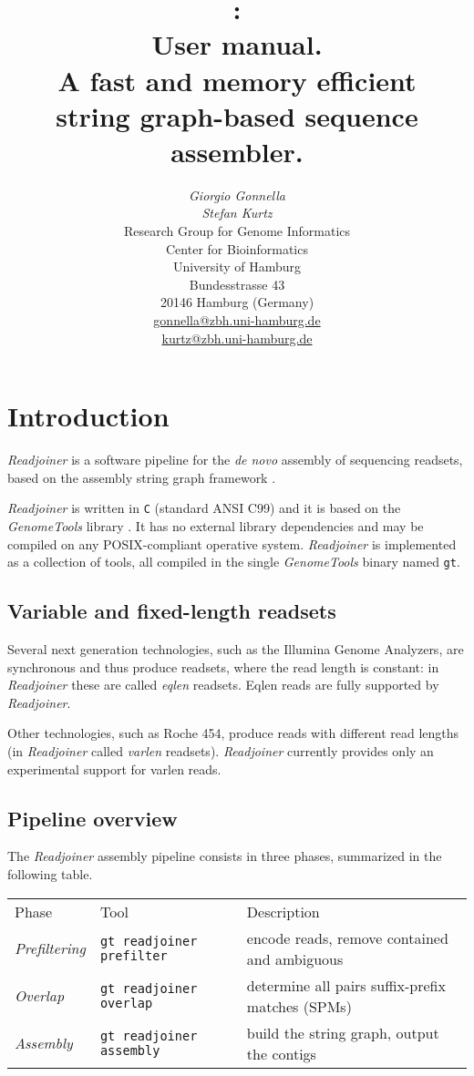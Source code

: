 \documentclass[12pt,titlepage]{article}
\title{\Huge{\Readjoiner 1.0:\\ User manual.}\\[3mm]
\Large{A fast and memory efficient \\string
 graph-based sequence assembler.}}
\author{\begin{tabular}{c}
         \textit{Giorgio Gonnella}\\
         \textit{Stefan Kurtz}\\[2cm]
         Research Group for Genome Informatics\\
         Center for Bioinformatics\\
         University of Hamburg\\
         Bundesstrasse 43\\
         20146 Hamburg (Germany)\\[1cm]
         \url{gonnella@zbh.uni-hamburg.de}\\
         \url{kurtz@zbh.uni-hamburg.de}\\[1cm]
        \end{tabular}}
\newcommand{\GenomeTools}{\textit{GenomeTools}\xspace}
\newcommand{\Readjoiner}{\textit{Readjoiner}\xspace}
\newcommand{\Gtcmd}{\texttt{gt}\xspace}
\newcommand{\Rdjprefiltercmd}{\texttt{gt readjoiner prefilter}\xspace}
\newcommand{\Rdjoverlapcmd}{\texttt{gt readjoiner overlap}\xspace}
\newcommand{\Rdjassemblycmd}{\texttt{gt readjoiner assembly}\xspace}
\begin{document}
\maketitle

\section{Introduction} \label{Introduction}

\Readjoiner is a software pipeline for the \textit{de novo} assembly of
 sequencing readsets, based on the assembly string graph framework
  \cite{MYE:2005}.

\Readjoiner is written in \texttt{C} (standard ANSI C99) and it is based on the
\GenomeTools library \cite{genometools}. It has no external library
dependencies and may be compiled on any POSIX-compliant operative system.
 \Readjoiner is implemented as a collection of tools, all compiled in the single
\GenomeTools binary named \Gtcmd.

\subsection{Variable and fixed-length readsets}

Several next generation technologies, such
as the Illumina Genome Analyzers, are synchronous and thus produce
readsets, where the read length is constant: in \Readjoiner these
are called \textit{eqlen} readsets.
Eqlen reads are fully supported by \Readjoiner.

Other technologies, such as Roche 454, produce
reads with different read lengths (in \Readjoiner called \textit{varlen}
readsets). \Readjoiner currently provides only an experimental support for varlen reads.

\subsection{Pipeline overview}

The \Readjoiner assembly pipeline consists in three phases, summarized in the
 following table.

\begin{tabular}{lll}
Phase & Tool & Description \\
\textit{Prefiltering} & \Rdjprefiltercmd &
  encode reads, remove contained and ambiguous\\
\textit{Overlap}   & \Rdjoverlapcmd &
  determine all pairs suffix-prefix matches (SPMs) \\
\textit{Assembly}  & \Rdjassemblycmd &
 build the string graph, output the contigs \\
\end{tabular}
\end{document}
